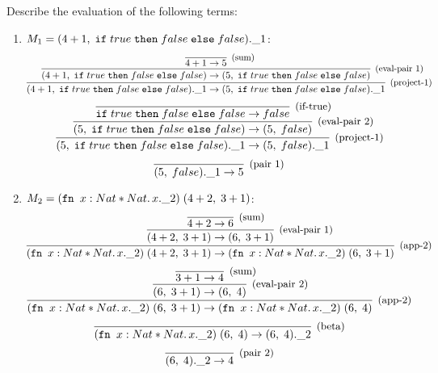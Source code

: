 \subsection{}

Describe the evaluation of the following terms:
\begin{enumerate}
\item $M_1 = (4+1,\;\texttt{if}\;true\;\texttt{then}\;false\;\texttt{else}\;false).\_1$:
  \[
  \infer[\text{\small{(project-1)}}]
	{ \FST{\PAIR{\SUM{4}{1}}{\IF{true}{false}{false}}} \to \FST{\PAIR{5}{\IF{true}{false}{false}}}}
	{
	  \infer[\text{\small{(eval-pair 1)}}]
		{ \PAIR{\SUM{4}{1}}{\IF{true}{false}{false}} \to \PAIR{5}{\IF{true}{false}{false}} }
		{ \infer[\text{\small{(sum)}}]{\SUM{4}{1} \to 5}{} }
	}
	\]
	\[
	\infer[\text{\small{(project-1)}}]
	      { \FST{\PAIR{5}{\IF{true}{false}{false}}} \to \FST{\PAIR{5}{false}}}
	      {
		\infer[\text{\small{(eval-pair 2)}}]
		      { \PAIR{5}{\IF{true}{false}{false}} \to \PAIR{5}{false}}
		      { \infer[\text{\small(if-true)}]{\IF{true}{false}{false} \to false}{} }
	      }
	      \]
	      \[
	      \infer[\text{\small{(pair 1)}}]
		    { \FST{\PAIR{5}{false}} \to 5}{}
	            \]
	          \item $M_2 = (\texttt{fn }x: Nat \ast Nat.\,x.\_2)\;(4+2,\;3+1)$:
	            \[
		    \infer[\text{\small{(app-2)}}]
		          {\APP{(\FN{x: Nat \ast Nat}{\SND{x}})}{\PAIR{\SUM{4}{2}}{\SUM{3}{1}}} \to \APP{(\FN{x: Nat \ast Nat}{\SND{x}})}{\PAIR{6}{\SUM{3}{1}}}}
		          {
			    \infer[\text{\small{(eval-pair 1)}}]
			          {\PAIR{\SUM{4}{2}}{\SUM{3}{1}} \to \PAIR{6}{\SUM{3}{1}}}
			          {
				    \infer[\text{\small{(sum)}}]{\SUM{4}{2} \to 6}{}
			          }
		          }
	                  \]
	                  \[
		          \infer[\text{\small{(app-2)}}]
		                {\APP{(\FN{x: Nat \ast Nat}{\SND{x}})}{\PAIR{6}{\SUM{3}{1}}} \to \APP{(\FN{x: Nat \ast Nat}{\SND{x}})}{\PAIR{6}{4}}}
		                {
			          \infer[\text{\small{(eval-pair 2)}}]
			                {\PAIR{6}{\SUM{3}{1}} \to \PAIR{6}{4}}
			                { \infer[\text{\small{(sum)}}]{\SUM{3}{1} \to 4}{} }
		                }
	                        \]
	                        \[
		                \infer[\text{\small{(beta)}}]
		                      {\APP{(\FN{x: Nat \ast Nat}{\SND{x}})}{\PAIR{6}{4}} \to \SND{\PAIR{6}{4}}}
		                      {}
	                              \]
	                              \[
		                      \infer[\text{\small{(pair 2)}}]{\SND{\PAIR{6}{4}} \to 4}{}
	                              \]

\end{enumerate}
